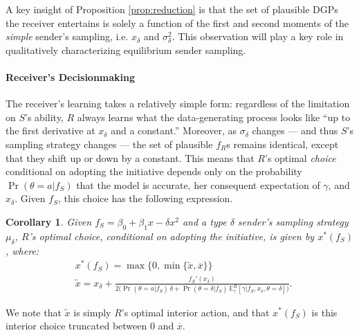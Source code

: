 \documentclass[11pt,dvipsnames]{article}
\newtheorem{corollary}{Corollary}
\begin{document}
A key insight of Proposition \ref{prop:reduction} is that the set of plausible DGPs the receiver entertains is solely a function of the first and second moments of the \emph{simple} sender's sampling, i.e. $x_\delta$ and $\sigma_\delta^2$.
This observation will play a key role in qualitatively characterizing equilibrium sender sampling.



\paragraph{Receiver's Decisionmaking}
The receiver's learning takes a relatively simple form: regardless of the limitation on $S$'s ability, $R$ always learns what the data-generating process looks like ``up to the first derivative at $x_\delta$ and a constant.'' 
Moreover, as $\sigma_\delta$ changes --- and thus $S$'s sampling strategy changes --- the set of plausible $f_R$s remains identical, except that they shift up or down by a constant.
This means that $R$'s optimal \emph{choice} conditional on adopting the initiative depends only on the probability $\Pr(\theta = a|f_S)$ that the model is accurate, her consequent expectation of $\gamma$, and $x_\delta$.
Given $f_S$, this choice has the following expression.
\begin{corollary}
Given $f_S = \beta_0+\beta_1x-\delta x^2$ and a type $\delta$ sender's sampling strategy $\mu_\delta$, $R$'s optimal choice, conditional on adopting the initiative, is given by $x^*(f_S)$, where:
\begin{align*}
&x^*(f_S)	= \max\{0,\min\{\tilde{x},\overline{x}\}\}
\\
&\tilde{x} = x_\delta + \frac{f_S'(x_\delta)}{2\big(\Pr(\theta=a|f_S)\,\delta+\Pr(\theta=\delta|f_S)\,\mathbb{E}_\gamma^R[\gamma|f_S,x_\delta,\theta=\delta]\big)}.
\end{align*}
\end{corollary}
We note that $\tilde{x}$ is simply $R$'s optimal interior action, and that $x^*(f_S)$ is this interior choice truncated between $0$ and $\overline{x}$.
\end{document}

